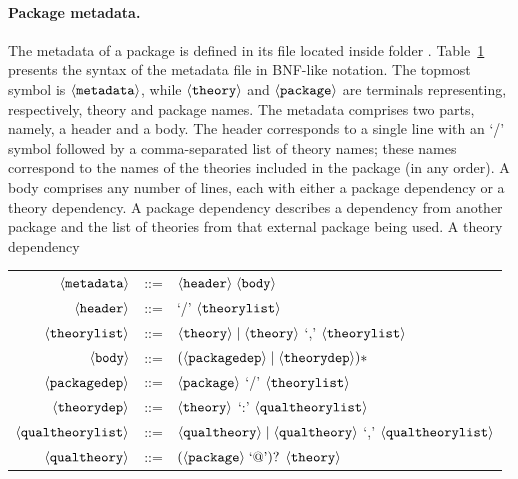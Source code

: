 \paragraph{Package metadata.} The metadata of a package is defined
in its  file located inside folder
. Table~\ref{tab.bnf} presents the syntax of the metadata
file in BNF-like notation. The topmost symbol is
$\langle{\texttt{metadata}}\rangle$, while $\langle{\texttt{theory}}\rangle$ and
$\langle{\texttt{package}}\rangle$ are terminals representing, respectively,
theory and package names. The metadata comprises two parts, namely, a
header and a body. The header corresponds to a single line with an `/'
symbol followed by a comma-separated list of theory names; these names
correspond to the names of the theories included in the package (in
any order). A body comprises any number of lines, each with either a
package dependency or a theory dependency. A package dependency
describes a dependency from another package and the list of
theories from that external package being used. A theory dependency



\begin{table}
  \centering
  \begin{tabular}{r c p{8cm}}
    $\langle{\texttt{metadata}}\rangle$ & ::= & $\langle{\texttt{header}}\rangle \; \langle{\texttt{body}}\rangle$ \\
    $\langle{\texttt{header}}\rangle$ & ::= & `/' $\langle{\texttt{theorylist}}\rangle$ \\
    $\langle{\texttt{theorylist}}\rangle$ & ::= & $\langle{\texttt{theory}}\rangle \mid \langle{\texttt{theory}}\rangle$ `,' $\langle{\texttt{theorylist}}\rangle$ \\
    $\langle{\texttt{body}}\rangle$ & ::= & $(\langle{\texttt{packagedep}}\rangle \mid \langle{\texttt{theorydep}}\rangle)*$ \\
    $\langle{\texttt{packagedep}}\rangle$ & ::= & $\langle{\texttt{package}}\rangle$ `/' $\langle{\texttt{theorylist}}\rangle$ \\
    $\langle{\texttt{theorydep}}\rangle$ & ::= & $\langle{\texttt{theory}}\rangle$ `:' $\langle{\texttt{qualtheorylist}}\rangle$ \\
    $\langle{\texttt{qualtheorylist}}\rangle$ & ::= & $\langle{\texttt{qualtheory}}\rangle \mid \langle{\texttt{qualtheory}}\rangle$ `,' $\langle{\texttt{qualtheorylist}}\rangle$ \\
    $\langle{\texttt{qualtheory}}\rangle$ & ::= & $(\langle{\texttt{package}}\rangle\; \text{`@'})?$ $\langle{\texttt{theory}}\rangle$ 
  \end{tabular}
  \label{tab.bnf}
\end{table}


